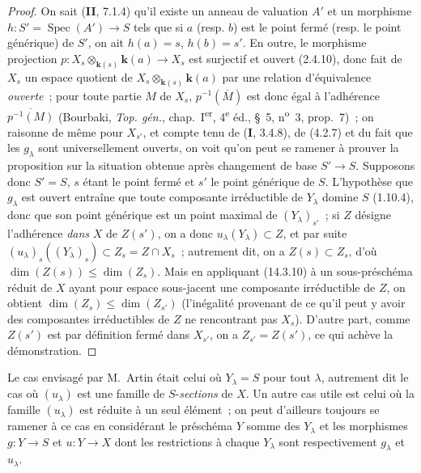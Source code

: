 \begin{proof}
On sait (\textbf{II}, 7.1.4) qu'il existe un anneau de valuation $A'$ et un
morphisme $h:S'=\operatorname{Spec}(A')\to S$ tels que si $a$ (resp. $b$) est le
point fermé (resp. le point générique) de $S'$, on ait $h(a)=s$, $h(b)=s'$. En
outre, le morphisme projection
$p:X_s\otimes_{\mathbf{k}(s)}\boldsymbol{k}(a)\to X_s$ est surjectif et ouvert (2.4.10), donc fait de
$X_s$ un espace quotient de $X_s\otimes_{\mathbf{k}(s)}\boldsymbol{k}(a)$ par une relation d'équivalence
\emph{ouverte}~; pour toute partie $M$ de $X_s$, $p^{-1}(\overline M)$ est donc égal à
l'adhérence $\overline{p^{-1}(M)}$ (Bourbaki, \emph{Top. gén.}, chap.~I\textsuperscript{er},
4\textsuperscript{e} éd., \S~5, n\textsuperscript{o}~3, prop.~7)~; on raisonne de
même pour $X_{s'}$, et compte tenu de (\textbf{I}, 3.4.8), de (4.2.7) et du fait que les
$g_\lambda$ sont universellement ouverts, on voit qu'on peut se ramener à prouver
la proposition sur la situation obtenue après changement de base $S'\to S$.
Supposons donc $S'=S$, $s$ étant le point fermé et $s'$ le point générique de $S$.
L'hypothèse que $g_\lambda$ est ouvert entraîne que toute composante irréductible
de $Y_\lambda$ domine $S$ (1.10.4), donc que son point générique est un point
maximal de $(Y_\lambda)_{s'}$~; si $Z$ désigne l'adhérence \emph{dans} $X$ de $Z(s')$, on
a donc $u_\lambda(Y_\lambda)\subset Z$, et par suite
$(u_\lambda)_s((Y_\lambda)_s)\subset Z_s=Z\cap X_s$~; autrement dit, on a
$Z(s)\subset Z_s$, d'où $\dim(Z(s))\leq\dim(Z_s)$. Mais en appliquant (14.3.10) à
un sous-préschéma réduit de $X$ ayant pour espace sous-jacent une composante
irréductible de $Z$, on obtient $\dim(Z_s)\leq\dim(Z_{s'})$ (l'inégalité provenant
de ce qu'il peut y avoir des composantes irréductibles de $Z$ ne rencontrant pas
$X_s$). D'autre part, comme $Z(s')$ est par définition fermé dans $X_{s'}$, on a
$Z_{s'}=Z(s')$, ce qui achève la démonstration.
\end{proof}

\begin{remark}[14.3.12]
\label{IV.14.3.12-fr}
Le cas envisagé par M.~Artin était celui où $Y_\lambda=S$ pour tout $\lambda$,
autrement dit le cas où $(u_\lambda)$ est une famille de $S$-\emph{sections} de $X$. Un
autre cas utile est celui où la famille $(u_\lambda)$ est réduite à un seul
élément~; on peut d'ailleurs toujours se ramener à ce cas en considérant le
préschéma $Y$ somme des $Y_\lambda$ et les morphismes $g:Y\to S$ et $u:Y\to X$
dont les restrictions à chaque $Y_\lambda$ sont respectivement $g_\lambda$ et
$u_\lambda$.
\end{remark}

